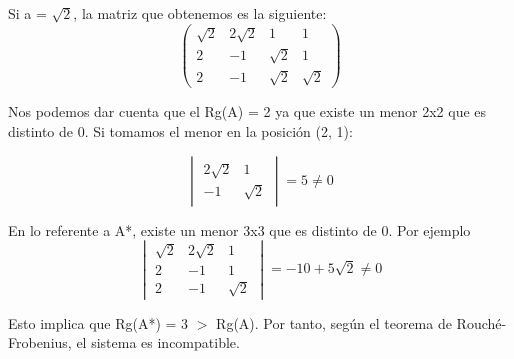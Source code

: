 \documentclass{article}
\begin{document}
Si a = $\sqrt{2}$, la matriz que obtenemos es la siguiente:
$$
\left(\begin{array}{ccc|c}\sqrt{2} & 2 \sqrt{2} & 1 & 1 \\2 & -1 & \sqrt{2} & 1\\2 & -1 & \sqrt{2} & \sqrt{2}\end{array}\right)$$

Nos podemos dar cuenta que el Rg(A) = 2 ya que existe un menor 2x2 que es distinto de 0. Si tomamos el menor en la posici\'on (2, 1):

$$
\begin{vmatrix}2 \sqrt{2} & 1\\-1 & \sqrt{2}\end{vmatrix} = 5 \neq 0$$

En lo referente a A*, existe un menor 3x3 que es distinto de 0. Por ejemplo $$
\begin{vmatrix}\sqrt{2} & 2 \sqrt{2} & 1 \\2 & -1 & 1\\2 & -1 & \sqrt{2}\end{vmatrix} = -10 + 5 \sqrt{2} \neq 0$$

Esto implica que Rg(A*) = 3 $>$ Rg(A). Por tanto, seg\'un el teorema de Rouch\'e-Frobenius, el sistema es incompatible.\\
\end{document}
